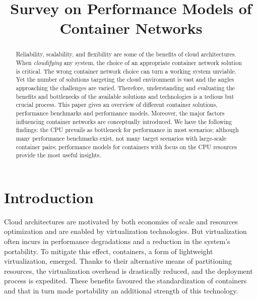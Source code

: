 \documentclass[conference]{IEEEtran}
\begin{document}
%
\title{Survey on Performance Models of Container Networks}


\author{
}

\maketitle

\begin{abstract}
Reliability, scalability, and flexibility are some of the benefits of cloud architectures.  When \textit{cloudifying} any system, the choice of an appropriate container network solution is critical. The wrong container network choice can turn a working system unviable. %
Yet the number of solutions targeting the cloud environment is vast and the angles approaching the challenges are varied. Therefore, understanding and evaluating the benefits and bottlenecks of the available solutions and technologies is a tedious but crucial process. This paper gives an overview of different container solutions, performance benchmarks and performance models. Moreover, the major factors influencing container networks are conceptually introduced. We have the following findings: the CPU prevails as bottleneck for performance in most scenarios; although many performance benchmarks exist, not many target scenarios with large-scale container pairs; performance models for containers with focus on the CPU resources provide the most useful insights. 
\end{abstract}


\section{Introduction}
Cloud architectures are motivated by both economies of scale and resources optimization and are enabled by virtualization technologies. But virtualization often incurs in performance degradations and a reduction in the system's portability. To mitigate this effect, containers, a form of lightweight virtualization, emerged. Thanks to their alternative means of partitioning resources, the virtualization overhead is drastically reduced, and the deployment process is expedited. These benefits favoured the standardization of containers and that in turn made portability an additional strength of this technology.
\end{document}
